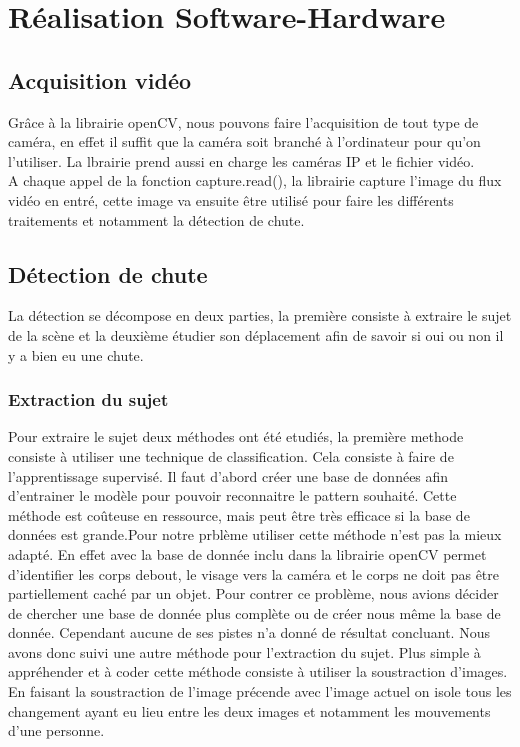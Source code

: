 \documentclass[a4paper]{report}
\begin{document}
            
            
    
    \chapter{Réalisation Software-Hardware}
    \section{Acquisition vidéo}
        Grâce à la librairie openCV, nous pouvons faire l'acquisition de tout type de caméra, en effet il suffit que la caméra soit branché à l'ordinateur pour qu'on l'utiliser. La lbrairie prend aussi en charge les caméras IP et le fichier vidéo.
        \\
        A chaque appel de la fonction capture.read(), la librairie capture l'image du flux vidéo en entré, cette image va ensuite être utilisé pour faire les différents traitements et notamment la détection de chute.

    \section{Détection de chute}
        La détection se décompose en deux parties, la première consiste à extraire le sujet de la scène et la deuxième étudier son déplacement afin de savoir si oui ou non il y a bien eu une chute.
        \subsection{Extraction du sujet}
        Pour extraire le sujet deux méthodes ont été etudiés, la première methode consiste à utiliser une technique de classification. Cela consiste à faire de l'apprentissage supervisé.
        Il faut d'abord créer une base de données afin d'entrainer le modèle pour pouvoir reconnaitre le pattern souhaité. Cette méthode est coûteuse en ressource, mais peut 
        être très efficace si la base de données est grande.Pour notre prblème utiliser cette méthode n'est pas la mieux adapté. En effet avec la base de donnée inclu dans la librairie openCV permet d'identifier les corps debout, le visage vers la caméra et le corps ne doit pas être partiellement caché par un objet. Pour contrer ce problème, nous avions décider de chercher une base de donnée plus complète ou de créer nous même la base de donnée. Cependant aucune de ses pistes n'a donné de résultat concluant. Nous avons donc suivi une autre méthode pour l'extraction du sujet. Plus simple à appréhender et à coder cette méthode consiste à utiliser la soustraction d'images. En faisant la soustraction de l'image précende avec l'image actuel on isole tous les changement ayant eu lieu entre les deux images et notamment les mouvements d'une personne.  
\end{document}
